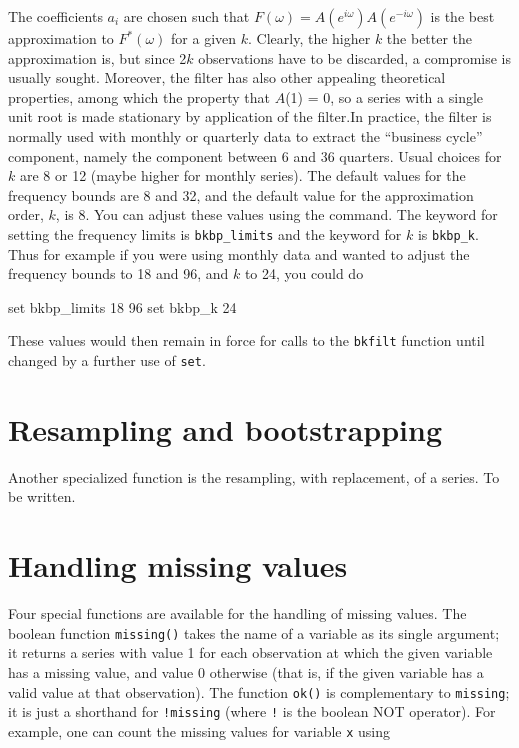 The coefficients $a\ensuremath{_{i}}$ are chosen such that $F(\omega)
= A(e^{i\omega})A(e^{-i\omega})$ is the best approximation to
$F^*(\omega)$ for a given $k$. Clearly, the higher $k$ the better the
approximation is, but since 2$k$ observations have to be discarded, a
compromise is usually sought. Moreover, the filter has also other
appealing theoretical properties, among which the property that $A$(1)
= 0, so a series with a single unit root is made stationary by
application of the filter.In practice, the filter is normally used
with monthly or quarterly data to extract the ``business cycle''
component, namely the component between 6 and 36 quarters. Usual
choices for $k$ are 8 or 12 (maybe higher for monthly series).  The
default values for the frequency bounds are 8 and 32, and the default
value for the approximation order, $k$, is 8. You can adjust these
values using the  command. The keyword for setting the
frequency limits is \verb+bkbp_limits+ and the keyword for $k$ is
\verb+bkbp_k+.  Thus for example if you were using monthly data and
wanted to adjust the frequency bounds to 18 and 96, and $k$ to 24, you
could do

\begin{code}
	set bkbp_limits 18 96
	set bkbp_k 24
\end{code}

These values would then remain in force for calls to the \verb+bkfilt+
function until changed by a further use of \verb+set+.
      

\section{Resampling and bootstrapping}
\label{genr-resample}

Another specialized function is the resampling, with replacement, of a
series.  To be written.
    

\section{Handling missing values}
\label{genr-missing}

Four special functions are available for the handling of missing
values.  The boolean function \verb+missing()+ takes the name of a
variable as its single argument; it returns a series with value 1 for
each observation at which the given variable has a missing value, and
value 0 otherwise (that is, if the given variable has a valid value at
that observation).  The function \verb+ok()+ is complementary to
\verb+missing+; it is just a shorthand for \verb+!missing+ (where
\verb+!+ is the boolean NOT operator).  For example, one can count the
missing values for variable \verb+x+ using

